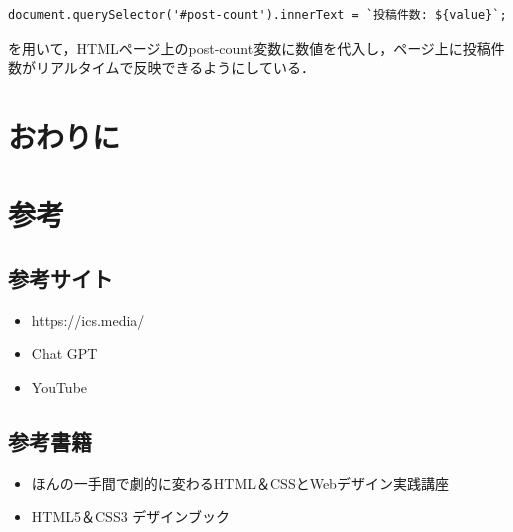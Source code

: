 \documentclass[uplatex,dvipdfmx]{jsarticle}
\begin{document}
\begin{lstlisting}[firstnumber = 1, caption=valueをpost-countに変換, label=code] 
    document.querySelector('#post-count').innerText = `投稿件数: ${value}`;
\end{lstlisting}

を用いて，HTMLページ上のpost-count変数に数値を代入し，ページ上に投稿件数がリアルタイムで反映できるようにしている．

\clearpage
\section{おわりに}



\section{参考}
\subsection{参考サイト}
\begin{itemize}
    \item https://ics.media/
    \item Chat GPT
    \item YouTube
\end{itemize}

\subsection{参考書籍}
\begin{itemize}
    \item ほんの一手間で劇的に変わるHTML＆CSSとWebデザイン実践講座
    \item HTML5＆CSS3 デザインブック
\end{itemize}
\end{document}
